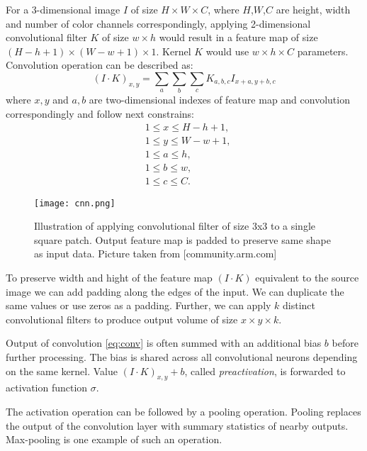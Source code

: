 For a 3-dimensional image $I$ of size $H \times W \times C$, where $H$,$W$,$C$ are height, width and number of color channels correspondingly, applying 2-dimensional convolutional filter $K$ of size $w \times h$ would result in a feature map of size $(H-h+1) \times (W-w+1) \times 1$. Kernel $K$ would use $w \times h \times C$ parameters. Convolution operation can be described as:
\begin{equation}\label{eq:conv}
  (I \cdot K)_{x, y} = \sum_a \sum_b \sum_c K_{a,b,c} I_{x+a, y+b,c}
\end{equation}
where ${x, y}$ and ${a,b}$ are two-dimensional indexes of feature map and convolution correspondingly and follow next constrains:
\begin{equation*}
  \begin{aligned}
  &1 \leq  x \leq H-h+1, \\
  &1 \leq  y \leq W-w+1, \\
  &1 \leq  a \leq h, \\
  &1 \leq  b \leq w, \\
  &1 \leq  c \leq C.
\end{aligned}
\end{equation*}

\begin{figure}
  \texttt{[image: cnn.png]}
  \caption{Illustration of applying convolutional filter of size 3x3 to a single square patch. Output feature map is padded to preserve same shape as input data. Picture taken from [community.arm.com]}
  \label{fig:cnn}
\end{figure}

To preserve width and hight of the feature map $(I \cdot K)$ equivalent to the source image we can add padding along the edges of the input. We can duplicate the same values or use zeros as a padding.
Further, we can apply $k$ distinct convolutional filters to produce output volume of size $x \times y \times k$.

Output of convolution \ref{eq:conv} is often summed with an additional bias $b$ before further processing.
The bias is shared across all convolutional neurons depending on the same kernel.
Value $(I \cdot K)_{x, y}+b$, called \textit{preactivation}, is forwarded to activation function $\sigma$.

The activation operation can be followed by a pooling operation.
Pooling replaces the output of the convolution layer with summary statistics of nearby outputs.
Max-pooling is one example of such an operation.

